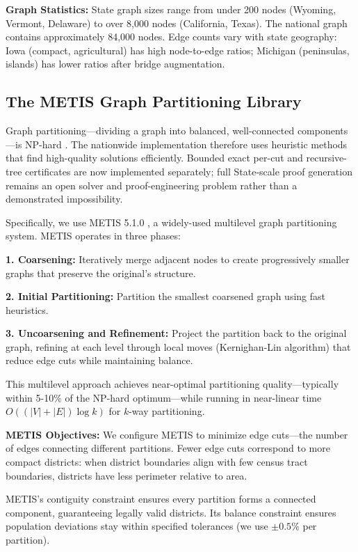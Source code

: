 \textbf{Graph Statistics:} State graph sizes range from under 200 nodes (Wyoming, Vermont, Delaware) to over 8,000 nodes (California, Texas). The national graph contains approximately 84,000 nodes. Edge counts vary with state geography: Iowa (compact, agricultural) has high node-to-edge ratios; Michigan (peninsulas, islands) has lower ratios after bridge augmentation.

\subsection{The METIS Graph Partitioning Library}

Graph partitioning—dividing a graph into balanced, well-connected components—is NP-hard \cite{garey1979computers}. The nationwide implementation therefore uses heuristic methods that find high-quality solutions efficiently. Bounded exact per-cut and recursive-tree certificates are now implemented separately; full State-scale proof generation remains an open solver and proof-engineering problem rather than a demonstrated impossibility.

Specifically, we use METIS 5.1.0 \cite{karypis1998fast}, a widely-used multilevel graph partitioning system. METIS operates in three phases:

\textbf{1. Coarsening:} Iteratively merge adjacent nodes to create progressively smaller graphs that preserve the original's structure.

\textbf{2. Initial Partitioning:} Partition the smallest coarsened graph using fast heuristics.

\textbf{3. Uncoarsening and Refinement:} Project the partition back to the original graph, refining at each level through local moves (Kernighan-Lin algorithm) that reduce edge cuts while maintaining balance.

This multilevel approach achieves near-optimal partitioning quality—typically within 5-10\% of the NP-hard optimum—while running in near-linear time $O((|V| + |E|) \log k)$ for $k$-way partitioning.

\textbf{METIS Objectives:} We configure METIS to minimize edge cuts—the number of edges connecting different partitions. Fewer edge cuts correspond to more compact districts: when district boundaries align with few census tract boundaries, districts have less perimeter relative to area.

METIS's contiguity constraint ensures every partition forms a connected component, guaranteeing legally valid districts. Its balance constraint ensures population deviations stay within specified tolerances (we use $\pm 0.5\%$ per partition).

